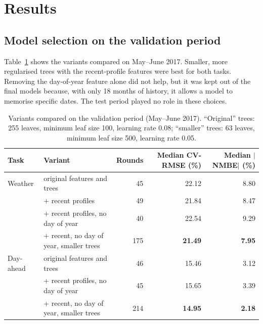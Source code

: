 \documentclass[11pt,a4paper]{article}
\begin{document}
\section{Results}\label{sec:results}

\subsection{Model selection on the validation period}
Table~\ref{tab:tuning} shows the variants compared on May--June 2017. Smaller, more regularised trees with the
recent-profile features were best for both tasks. Removing the day-of-year feature alone did not help, but it was
kept out of the final models because, with only 18 months of history, it allows a model to memorise specific
dates. The test period played no role in these choices.

\begin{table}[ht]
\centering
\caption{Variants compared on the validation period (May--June 2017). ``Original'' trees: 255 leaves, minimum leaf
size 100, learning rate 0.08; ``smaller'' trees: 63 leaves, minimum leaf size 500, learning rate 0.05.}
\label{tab:tuning}
\footnotesize\setlength{\tabcolsep}{4pt}
\begin{tabular}{llrrr}
\toprule
Task & Variant & Rounds & Median CV-RMSE (\%) & Median $|$NMBE$|$ (\%) \\
\midrule
Weather   & original features and trees                   &  45 & 22.12 & 8.80 \\
          & + recent profiles                              &  49 & 21.84 & 8.47 \\
          & + recent profiles, no day of year              &  40 & 22.54 & 9.29 \\
          & + recent, no day of year, smaller trees & 175 & \textbf{21.49} & \textbf{7.95} \\
\midrule
Day-ahead & original features and trees                   &  46 & 15.46 & 3.12 \\
          & + recent profiles, no day of year              &  45 & 15.65 & 3.39 \\
          & + recent, no day of year, smaller trees & 214 & \textbf{14.95} & \textbf{2.18} \\
\bottomrule
\end{tabular}
\end{table}
\end{document}
